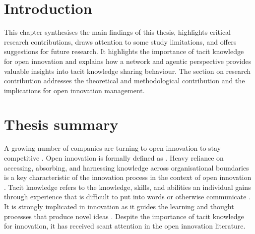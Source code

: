 
\section{Introduction}

This chapter synthesises the main findings of this thesis, highlights critical research contributions, draws attention to  some study limitations, and offers suggestions for future research. It highlights the importance of tacit knowledge for open innovation and explains how a network and agentic perspective provides valuable insights into tacit knowledge sharing behaviour. The section on research contribution addresses the theoretical and methodological contribution and the implications for open innovation management. 

\section{Thesis summary}

A growing number of companies are turning to open innovation to stay competitive \citep{stanko2017under}. Open innovation is formally defined as  \citep{chesbrough2014explicating}. Heavy reliance on accessing, absorbing, and harnessing knowledge across organisational boundaries is a key characteristic of the innovation process in the context of open innovation \citep{chesbrough2012open}. Tacit knowledge refers to the knowledge, skills, and abilities an individual gains through experience that is difficult to put into words or otherwise communicate \citep{kreutz2014catalyzing}. It is strongly implicated in innovation as it guides the learning and thought processes that produce novel ideas \citep{leonard1998role,lam2000tacit}. Despite the importance of tacit knowledge for innovation, it has received scant attention in the open innovation literature. \medskip

